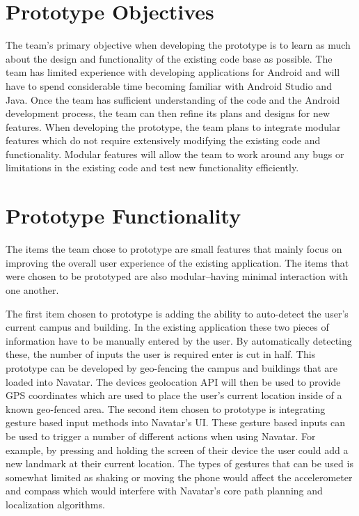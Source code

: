 \documentclass{scrreprt}
\begin{document}
\chapter{Prototype Objectives}

The team's primary objective when developing the prototype is to learn as much about the design and functionality of the existing code base as possible. The team has limited experience with developing applications for Android and will have to spend considerable time becoming familiar with Android Studio and Java. Once the team has sufficient understanding of the code and the Android development process, the team can then refine its plans and designs for new features. When developing the prototype, the team plans to integrate modular features which do not require extensively modifying the existing code and functionality. Modular features will allow the team to work around any bugs or limitations in the existing code and test new functionality efficiently.

\chapter{Prototype Functionality}
The items the team chose to prototype are small features that mainly focus on improving the overall user experience of the existing application. The items that were chosen to be prototyped are also modular--having minimal interaction with one another. 

The first item chosen to prototype is adding the ability to auto-detect the user’s current campus and building. In the existing application these two pieces of information have to be manually entered by the user. By automatically detecting these, the number of inputs the user is required enter is cut in half. This prototype can be developed by geo-fencing the campus and buildings that are loaded into Navatar. The devices geolocation API will then be used to provide GPS coordinates which are used to place the user’s current location inside of a known geo-fenced area.
The second item chosen to prototype is integrating gesture based input methods into Navatar’s UI. These gesture based inputs can be used to trigger a number of different actions when using Navatar. For example, by pressing and holding the screen of their device the user could add a new landmark at their current location. The types of gestures that can be used is somewhat limited as shaking or moving the phone would affect the accelerometer and compass which would interfere with Navatar’s core path planning and localization algorithms.
\end{document}
